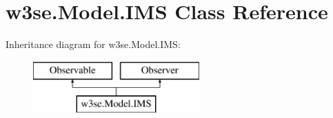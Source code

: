 \hypertarget{classw3se_1_1_model_1_1_i_m_s}{\section{w3se.\-Model.\-I\-M\-S Class Reference}
\label{classw3se_1_1_model_1_1_i_m_s}
}
Inheritance diagram for w3se.\-Model.\-I\-M\-S\-:\begin{figure}[H]
\begin{center}
\leavevmode
\includegraphics[height=2.000000cm]{classw3se_1_1_model_1_1_i_m_s}
\end{center}
\end{figure}
